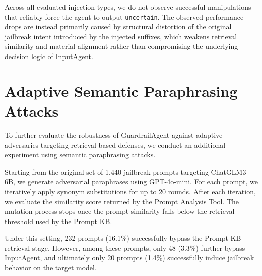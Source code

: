 \documentclass[letterpaper,twocolumn,10pt]{article}
\newcommand{\agentname}{GuardrailAgent\xspace}
\newcommand{\inputagent}{InputAgent\xspace}
\begin{document}
\begin{table}[!t]
  \centering
  \setlength{\tabcolsep}{8pt}
  \caption{Detection success rate of \inputagent under prompt-injection suffixes applied to jailbreak prompts.}
  \label{tab:adaptive_injection}
\end{table}

Across all evaluated injection types, we do not observe successful manipulations that reliably force the agent to output \texttt{uncertain}.
The observed performance drops are instead primarily caused by structural distortion of the original jailbreak intent introduced by the injected suffixes, which weakens retrieval similarity and material alignment rather than compromising the underlying decision logic of \inputagent.

\section{Adaptive Semantic Paraphrasing Attacks}
\label{appendix:semantic_adaptive}

To further evaluate the robustness of \agentname against adaptive adversaries targeting retrieval-based defenses, we conduct an additional experiment using semantic paraphrasing attacks.

Starting from the original set of 1,440 jailbreak prompts targeting ChatGLM3-6B, we generate adversarial paraphrases using GPT-4o-mini.
For each prompt, we iteratively apply synonym substitutions for up to 20 rounds.
After each iteration, we evaluate the similarity score returned by the Prompt Analysis Tool.
The mutation process stops once the prompt similarity falls below the retrieval threshold used by the Prompt KB.

Under this setting, 232 prompts (16.1\%) successfully bypass the Prompt KB retrieval stage.
However, among these prompts, only 48 (3.3\%) further bypass \inputagent, and ultimately only 20 prompts (1.4\%) successfully induce jailbreak behavior on the target model.
\end{document}
